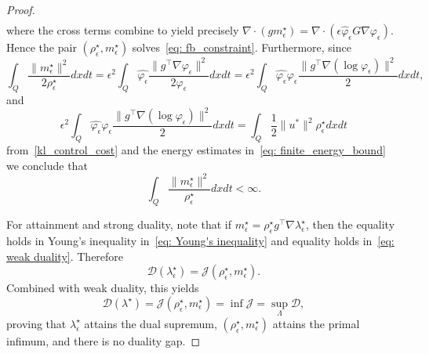 \documentclass[10pt,a4paper]{amsart}
\begin{document}
\begin{proof}
\begin{align*}
\end{align*}
where the cross terms combine to yield precisely $\nabla\cdot(gm_{\epsilon}^\star) = \nabla\cdot(\epsilon\hat\varphi_{\epsilon} G\nabla\varphi_{\epsilon})$. Hence the pair $(\rho_{\epsilon}^\star,m_{\epsilon}^\star)$ solves~\eqref{eq: fb_constraint}. Furthermore, since
\[
\int_Q \frac{\|m_{\epsilon}^\star\|^2}{2\rho_{\epsilon}^\star} dxdt = \epsilon^2 \int_Q \hat{\varphi_{\epsilon}} \frac{\|g^\top \nabla\varphi_{\epsilon}\|^2}{2\varphi_{\epsilon}} dxdt= \epsilon^2\int_Q \hat{\varphi_{\epsilon}}  \varphi_{\epsilon} \frac{\|g^\top \nabla(\log\varphi_{\epsilon})\|^2}{2}   dxdt,
\]
and
\[
\epsilon^2\int_Q \hat{\varphi_{\epsilon}}   \varphi_{\epsilon}   \frac{\|g^\top \nabla(\log\varphi_{\epsilon})\|^2}{2}   dxdt=\int_Q  \frac12\|u^*\|^2\rho_{\epsilon}^\star   dxdt
\]
from~\eqref{kl_control_cost} and the energy estimates in~\eqref{eq: finite_energy_bound} we conclude that
\[
\int_Q \frac{\|m_{\epsilon}^\star\|^2}{\rho_{\epsilon}^\star} dxdt<\infty.
\]

For attainment and strong duality, note that if $m_{\epsilon}^\star=\rho_{\epsilon}^\star g^\top\nabla\lambda_{\epsilon}^\star$, then the equality holds in Young's inequality in~\eqref{eq: Young's inequality} and equality holds in~\eqref{eq: weak duality}. Therefore
\[
\mathcal D(\lambda_{\epsilon}^\star) = \mathcal J(\rho_{\epsilon}^\star,m_{\epsilon}^\star).
\]
Combined with weak duality, this yields
\[
\mathcal D(\lambda^\star) = \mathcal J(\rho_{\epsilon}^\star,m_{\epsilon}^\star) = \inf\mathcal J = \sup_{\Lambda}\mathcal D,
\]
proving that $\lambda_{\epsilon}^\star$ attains the dual supremum, $(\rho_{\epsilon}^\star,m_{\epsilon}^\star)$ attains the primal infimum, and there is no duality gap.


\end{proof}
\end{document}
